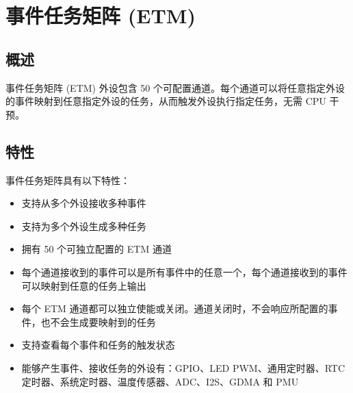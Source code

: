 \documentclass[main\_\_CN.tex]{subfiles}
\begin{document}

\ifglobal
\else
    \listoftodos
    {\let\clearpage\relax \listofdonetodos}
    \tableofcontents
\fi




\hypertarget{evntaskmatrix}{}
\chapter{事件任务矩阵 (ETM)}
\label{mod:evntaskmatrix}



\section{概述}
事件任务矩阵 (ETM) 外设包含 50 个可配置通道。每个通道可以将任意指定外设的事件映射到任意指定外设的任务，从而触发外设执行指定任务，无需 CPU 干预。


\section{特性}
\label{sec:evntaskmatrix-features}

事件任务矩阵具有以下特性：
\begin{itemize}
    \item 支持从多个外设接收多种事件
    \item 支持为多个外设生成多种任务
    \item 拥有 50 个可独立配置的 ETM 通道
    \item 每个通道接收到的事件可以是所有事件中的任意一个，每个通道接收到的事件可以映射到任意的任务上输出
    \item 每个 ETM 通道都可以独立使能或关闭。通道关闭时，不会响应所配置的事件，也不会生成要映射到的任务
    \item 支持查看每个事件和任务的触发状态
    \item 能够产生事件、接收任务的外设有：GPIO、LED PWM、通用定时器、RTC 定时器、系统定时器、温度传感器、ADC、I2S、GDMA 和 PMU
\end{itemize}
\end{document}
